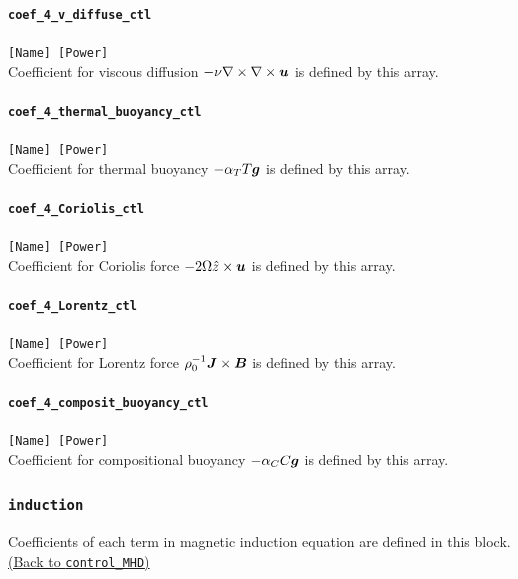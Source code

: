 \paragraph{\tt coef\_4\_v\_diffuse\_ctl}
\label{href_t:coef_4_v_diffuse_ctl}
\verb|[Name] [Power]| \\
Coefficient for viscous diffusion $- \nu \nabla \times \nabla \times \mbox{\boldmath$u$}$ is defined by this array.

\paragraph{\tt coef\_4\_thermal\_buoyancy\_ctl}
\label{href_t:coef_4_thermal_buoyancy_ctl}
\verb|[Name] [Power]| \\
Coefficient for thermal buoyancy $- \alpha_{T} T \mbox{\boldmath$g$}$ is defined by this array.

\paragraph{\tt coef\_4\_Coriolis\_ctl}
\label{href_t:coef_4_Coriolis_ctl}
\verb|[Name] [Power]| \\
Coefficient for Coriolis force $-2 \Omega \hat{z} \times \mbox{\boldmath$u$}$ is defined by this array.

\paragraph{\tt coef\_4\_Lorentz\_ctl}
\label{href_t:coef_4_Lorentz_ctl}
\verb|[Name] [Power]| \\
Coefficient for Lorentz force $ \rho_{0}^{-1} \mbox{\boldmath$J$} \times \mbox{\boldmath$B$}$ is defined by this array.

\paragraph{\tt coef\_4\_composit\_buoyancy\_ctl}
\label{href_t:coef_4_composit_buoyancy_ctl}
\verb|[Name] [Power]| \\
Coefficient for compositional buoyancy $ -\alpha_{C} C \mbox{\boldmath$g$}$ is defined by this array.

\subsubsection{\tt induction}
\label{href_t:induction}
Coefficients of each term in magnetic induction equation are defined in this block. \\
\hyperref[href_i:induction]{(Back to {\tt control\_MHD})}


